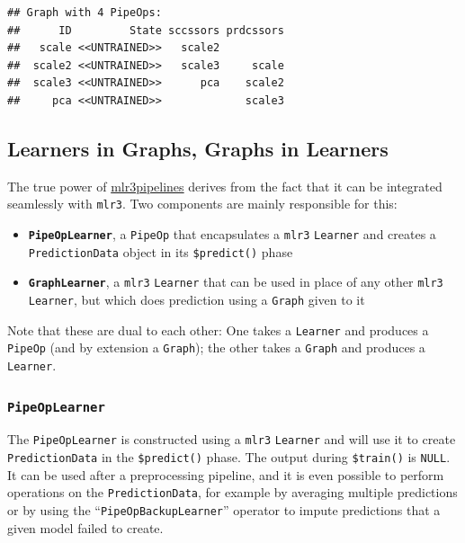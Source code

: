 \documentclass[]{scrbook}
\providecommand{\tightlist}{%
  \setlength{\itemsep}{0pt}\setlength{\parskip}{0pt}}
\begin{document}
\begin{verbatim}
## Graph with 4 PipeOps:
##      ID         State sccssors prdcssors
##   scale <<UNTRAINED>>   scale2          
##  scale2 <<UNTRAINED>>   scale3     scale
##  scale3 <<UNTRAINED>>      pca    scale2
##     pca <<UNTRAINED>>             scale3
\end{verbatim}

\hypertarget{learners-in-graphs-graphs-in-learners}{%
\subsection{Learners in Graphs, Graphs in Learners}\label{learners-in-graphs-graphs-in-learners}}

The true power of \href{https://cran.r-project.org/package=mlr3pipelines}{mlr3pipelines} derives from the fact that it can be integrated seamlessly with \texttt{mlr3}.
Two components are mainly responsible for this:

\begin{itemize}
\tightlist
\item
  \textbf{\texttt{PipeOpLearner}}, a \texttt{PipeOp} that encapsulates a \texttt{mlr3} \texttt{Learner} and creates a \texttt{PredictionData} object in its \texttt{\$predict()} phase
\item
  \textbf{\texttt{GraphLearner}}, a \texttt{mlr3} \texttt{Learner} that can be used in place of any other \texttt{mlr3} \texttt{Learner}, but which does prediction using a \texttt{Graph} given to it
\end{itemize}

Note that these are dual to each other: One takes a \texttt{Learner} and produces a \texttt{PipeOp} (and by extension a \texttt{Graph}); the other takes a \texttt{Graph} and produces a \texttt{Learner}.

\hypertarget{pipeoplearner}{%
\subsubsection{\texorpdfstring{\texttt{PipeOpLearner}}{PipeOpLearner}}\label{pipeoplearner}}

The \texttt{PipeOpLearner} is constructed using a \texttt{mlr3} \texttt{Learner} and will use it to create \texttt{PredictionData} in the \texttt{\$predict()} phase.
The output during \texttt{\$train()} is \texttt{NULL}.
It can be used after a preprocessing pipeline, and it is even possible to perform operations on the \texttt{PredictionData}, for example by averaging multiple predictions or by using the ``\texttt{PipeOpBackupLearner}'' operator to impute predictions that a given model failed to create.
\end{document}
